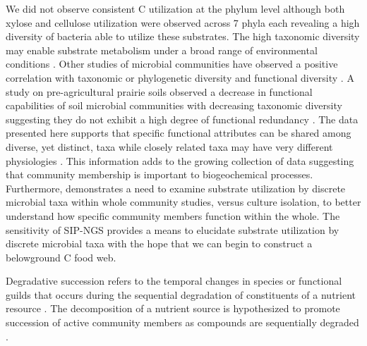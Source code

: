 We did not observe consistent C utilization at the phylum level although both xylose and cellulose utilization were observed across 7 phyla each revealing a high diversity of bacteria able to utilize these substrates. The high taxonomic diversity may enable substrate metabolism under a broad range of environmental conditions \cite{Goldfarb_2011}. Other studies of microbial communities have observed a positive correlation with taxonomic or phylogenetic diversity and functional diversity \cite{Fierer_2012,Fierer_2013,Philippot_2010,Tringe_2005,Gilbert_2010,Bryant_2012}. A study on pre-agricultural prairie soils observed a decrease in functional capabilities of soil microbial communities with decreasing taxonomic diversity suggesting they do not exhibit a high degree of functional redundancy \cite{Fierer_2013}. The data presented here supports that specific functional attributes can be shared among diverse, yet distinct, taxa while closely related taxa may have very different physiologies \cite{Fierer_2012,Philippot_2010}. This information adds to the growing collection of data suggesting that community membership is important to biogeochemical processes. Furthermore, demonstrates a need to examine substrate utilization by discrete microbial taxa within whole community studies, versus culture isolation, to better understand how specific community members function within the whole. The sensitivity of SIP-NGS provides a means to elucidate substrate utilization by discrete microbial taxa with the hope that we can begin to construct a belowground C food web.          
 
 
 Degradative succession refers to the temporal changes in species or functional guilds that occurs during the sequential degradation of constituents of a nutrient resource \cite{townsend2003essentials,Bastian_2009}. The decomposition of a nutrient source is hypothesized to promote succession of active community members as compounds are sequentially degraded \cite{Biddanda_1988}. 


